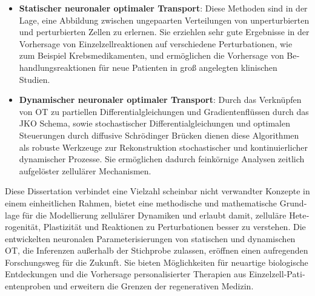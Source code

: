 \begin{otherlanguage}{ngerman}
\begin{itemize}[leftmargin=*]
	\item \textbf{Statischer neuronaler optimaler Transport}: 
	Diese Methoden sind in der Lage, eine Abbildung zwischen ungepaarten Verteilungen von unperturbierten und perturbierten Zellen zu erlernen. Sie erziehlen sehr gute Ergebnisse in der Vorhersage von Einzelzellreaktionen auf verschiedene Perturbationen, wie zum Beispiel Krebsmedikamenten, und erm{\"o}glichen die Vorhersage von Behandlungsreaktionen f{\"u}r neue Patienten in gro{\ss} angelegten klinischen Studien.

	\item \textbf{Dynamischer neuronaler optimaler Transport}: 
	Durch das Verkn{\"u}pfen von \acrshort{OT} zu partiellen Differentialgleichungen und Gradientenfl{\"u}ssen durch das \acrlong{JKO} Schema, sowie stochastischer Differentialgleichungen und optimalen Steuerungen durch diffusive Schr{\"o}dinger Br{\"u}cken dienen diese Algorithmen als robuste Werkzeuge zur Rekonstruktion stochastischer und kontinuierlicher dynamischer Prozesse. Sie erm{\"o}glichen dadurch feink{\"o}rnige Analysen zeitlich aufgel{\"o}ster zellul{\"a}rer Mechanismen.
\end{itemize}

Diese Dissertation verbindet eine Vielzahl scheinbar nicht verwandter Konzepte in einem einheitlichen Rahmen, bietet eine methodische und mathematische Grundlage f{\"u}r die Modellierung zellul{\"a}rer Dynamiken und erlaubt damit, zellul{\"a}re Heterogenit{\"a}t, Plastizit{\"a}t und Reaktionen zu Perturbationen besser zu verstehen. Die entwickelten neuronalen Parameterisierungen von statischen und dynamischen \acrshort{OT}, die Inferenzen au{\ss}erhalb der Stichprobe zulassen, er{\"o}ffnen einen aufregenden Forschungsweg f{\"u}r die Zukunft. Sie bieten M{\"o}glichkeiten f{\"u}r neuartige biologische Entdeckungen und die Vorhersage personalisierter Therapien aus Einzelzell-Patientenproben und erweitern die Grenzen der regenerativen Medizin.


\end{otherlanguage}

\endgroup

\vfill